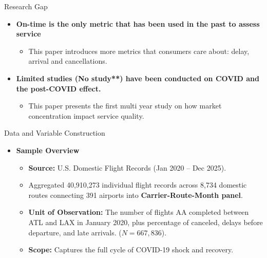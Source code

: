 \documentclass[t]{beamer}
\begin{document}
\begin{frame}{Research Gap}
    \begin{itemize}
        \item \textbf{On-time is the only metric that has been used in the past to assess service}
            \begin{itemize}
                \item This paper introduces more metrics that consumers care about: delay, arrival and cancellations.
            \end{itemize}
        \item \textbf{Limited studies (No study**) have been conducted on COVID and the post-COVID effect.}
            \begin{itemize}
                \item This paper presents the first multi year study on how market concentration impact service quality.
            \end{itemize}
    \end{itemize}
\end{frame}


\begin{frame}{Data and Variable Construction}
    \begin{itemize}
        \item \textbf{Sample Overview}
        \begin{itemize}
            \item \textbf{Source:} U.S. Domestic Flight Records (Jan 2020 -- Dec 2025).
            \addlinespace
            \item Aggregated 40,910,273 individual
flight records across 8,734 domestic routes connecting 391 airports into \textbf{Carrier-Route-Month panel}.
\addlinespace
            \item \textbf{Unit of Observation:} The number of flights AA completed between ATL and LAX in January 2020, plus percentage of canceled, delays before departure, and late arrivals. ($N = 667,836$).
            \addlinespace
            \item \textbf{Scope:} Captures the full cycle of COVID-19 shock and recovery.
        \end{itemize}
    \end{itemize}
\end{frame}
\end{document}
